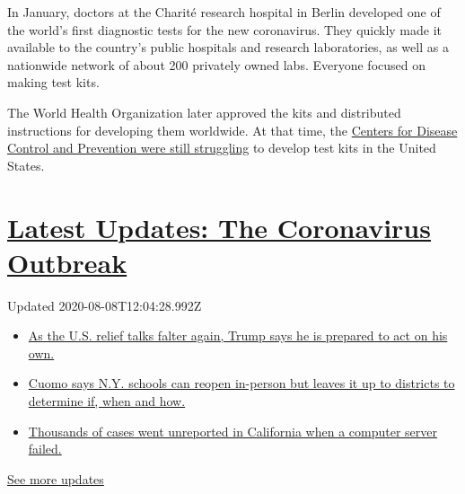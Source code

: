 In January, doctors at the Charité research hospital in Berlin developed
one of the world's first diagnostic tests for the new coronavirus. They
quickly made it available to the country's public hospitals and research
laboratories, as well as a nationwide network of about 200 privately
owned labs. Everyone focused on making test kits.

The World Health Organization later approved the kits and distributed
instructions for developing them worldwide. At that time, the
\href{https://www.nytimes.com/2020/03/28/us/testing-coronavirus-pandemic.html}{Centers
for Disease Control and Prevention were still struggling} to develop
test kits in the United States.

\hypertarget{latest-updates-the-coronavirus-outbreak}{%
\section{\texorpdfstring{\href{https://www.nytimes.com/2020/08/07/world/covid-19-news.html?action=click\&pgtype=Article\&state=default\&region=MAIN_CONTENT_1\&context=storylines_live_updates}{Latest
Updates: The Coronavirus
Outbreak}}{Latest Updates: The Coronavirus Outbreak}}\label{latest-updates-the-coronavirus-outbreak}}

Updated 2020-08-08T12:04:28.992Z

\begin{itemize}
\tightlist
\item
  \href{https://www.nytimes.com/2020/08/07/world/covid-19-news.html?action=click\&pgtype=Article\&state=default\&region=MAIN_CONTENT_1\&context=storylines_live_updates\#link-1f86d03a}{As
  the U.S. relief talks falter again, Trump says he is prepared to act
  on his own.}
\item
  \href{https://www.nytimes.com/2020/08/07/world/covid-19-news.html?action=click\&pgtype=Article\&state=default\&region=MAIN_CONTENT_1\&context=storylines_live_updates\#link-3f64a70a}{Cuomo
  says N.Y. schools can reopen in-person but leaves it up to districts
  to determine if, when and how.}
\item
  \href{https://www.nytimes.com/2020/08/07/world/covid-19-news.html?action=click\&pgtype=Article\&state=default\&region=MAIN_CONTENT_1\&context=storylines_live_updates\#link-14e70066}{Thousands
  of cases went unreported in California when a computer server failed.}
\end{itemize}

\href{https://www.nytimes.com/2020/08/07/world/covid-19-news.html?action=click\&pgtype=Article\&state=default\&region=MAIN_CONTENT_1\&context=storylines_live_updates}{See
more updates}

